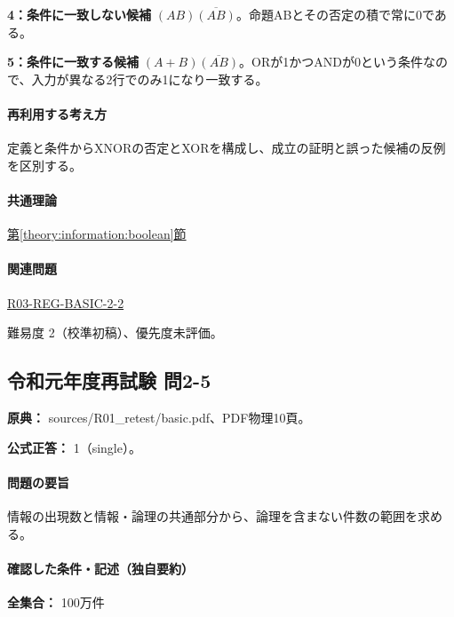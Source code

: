 \noindent\textbf{4：条件に一致しない候補} \((AB)\overline{(AB)}\)。命題ABとその否定の積で常に0である。\par

\noindent\textbf{5：条件に一致する候補} \((A+B)\overline{(AB)}\)。ORが1かつANDが0という条件なので、入力が異なる2行でのみ1になり一致する。\par

\paragraph{再利用する考え方} 定義と条件からXNORの否定とXORを構成し、成立の証明と誤った候補の反例を区別する。

\paragraph{共通理論} \hyperref[theory:information:boolean]{第\ref*{theory:information:boolean}節}

\paragraph{関連問題} \hyperref[q:r03-reg-basic-2-2]{R03-REG-BASIC-2-2}

\par 難易度 2（校準初稿）、優先度未評価。

\subsection{令和元年度再試験 問2-5}
\label{q:r01-ret-basic-2-5}

\noindent\textbf{原典：} sources/R01\_retest/basic.pdf、PDF物理10頁。

\textbf{公式正答：} 1（single）。

\paragraph{問題の要旨} 情報の出現数と情報・論理の共通部分から、論理を含まない件数の範囲を求める。

\paragraph{確認した条件・記述（独自要約）}\mbox{}\par

\noindent\textbf{全集合：} 100万件\par


